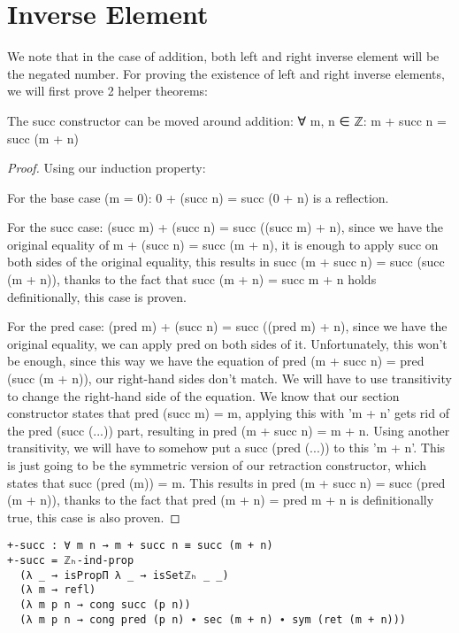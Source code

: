 \section{Inverse Element}
We note that in the case of addition, both left and right inverse element will be the negated number.
For proving the existence of left and right inverse elements, we will first prove 2 helper theorems:

\begin{theorem}
  The succ constructor can be moved around addition: ∀ m, n ∈ ℤ: m + succ n = succ (m + n)
\end{theorem}

\begin{proof}
  Using our induction property:

  For the base case (m = 0): 0 + (succ n) = succ (0 + n) is a reflection.

  For the succ case: (succ m) + (succ n) = succ ((succ m) + n), since we have the original equality of m + (succ n) = succ (m + n), it is enough to apply succ on both sides of the original equality, this results in succ (m + succ n) = succ (succ (m + n)), thanks to the fact that succ (m + n) = succ m + n holds definitionally, this case is proven.

  For the pred case: (pred m) + (succ n) = succ ((pred m) + n), since we have the original equality, we can apply pred on both sides of it. Unfortunately, this won't be enough, since this way we have the equation of pred (m + succ n) = pred (succ (m + n)), our right-hand sides don't match. We will have to use transitivity to change the right-hand side of the equation. We know that our section constructor states that pred (succ m) = m, applying this with 'm + n' gets rid of the pred (succ (...)) part, resulting in pred (m + succ n) = m + n. Using another transitivity, we will have to somehow put a succ (pred (...)) to this 'm + n'. This is just going to be the symmetric version of our retraction constructor, which states that succ (pred (m)) = m. This results in pred (m + succ n) = succ (pred (m + n)), thanks to the fact that pred (m + n) = pred m + n is definitionally true, this case is also proven.
\end{proof}

\begin{listing}[H]
\begin{verbatim}
+-succ : ∀ m n → m + succ n ≡ succ (m + n)
+-succ = ℤₕ-ind-prop
  (λ _ → isPropΠ λ _ → isSetℤₕ _ _)
  (λ m → refl)
  (λ m p n → cong succ (p n))
  (λ m p n → cong pred (p n) ∙ sec (m + n) ∙ sym (ret (m + n)))
\end{verbatim}
\caption{Agda proof of moving succ around addition}
\end{listing}

